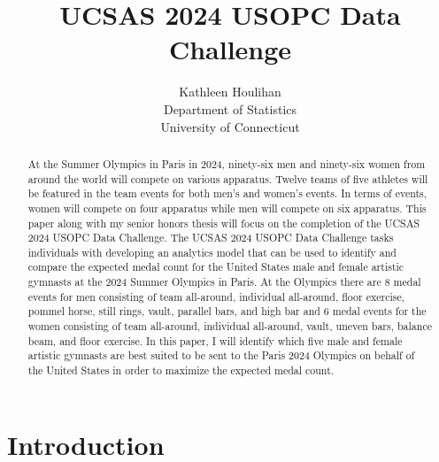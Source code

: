 \documentclass[12pt]{article}
\title{UCSAS 2024 USOPC Data Challenge}
\author{Kathleen Houlihan\\
  Department of Statistics\\
  University of Connecticut
}
\begin{document}
\maketitle

\begin{abstract}

  At the Summer Olympics in Paris in 2024, ninety-six men and ninety-six women 
  from around the world will compete on various apparatus. Twelve teams of five athletes will be 
  featured in the team events for both men's and women's events. In terms of events, women
  will compete on four apparatus while men will compete on six apparatus. This paper along 
  with my senior honors thesis will focus on the completion of the UCSAS 2024 USOPC Data Challenge. 
  The UCSAS 2024 USOPC Data Challenge tasks individuals with developing an analytics model that
  can be used to identify and compare the expected medal count for the United States male and 
  female artistic gymnasts at the 2024 Summer Olympics in Paris. At the Olympics there are 8 
  medal events for men consisting of team all-around, individual all-around, floor exercise, 
  pommel horse, still rings, vault, parallel bars, and high bar and 6 medal events for the women 
  consisting of team all-around, individual all-around, vault, uneven bars, balance beam, and 
  floor exercise. In this paper, I will identify which five male and female artistic gymnasts 
  are best suited to be sent to the Paris 2024 Olympics on behalf of the United States in order 
  to maximize the expected medal count.

\end{abstract}

\section{Introduction}
\label{sec:intro}
\end{document}
